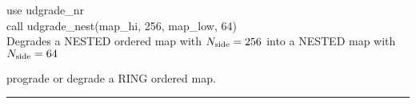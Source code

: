 \begin{example}
{
use udgrade\_nr \\
call udgrade\_nest(map\_hi, 256, map\_low, 64)  \\
}
{
Degrades a NESTED ordered map with $N_{\mathrm{side}}=256$ into a NESTED map with $N_{\mathrm{side}}=64$
}
\end{example}

\begin{related}
  \begin{sulist}{} %
  \item[\htmlref{udgrade\_ring}{sub:udgrade_ring}] prograde or degrade a RING
  ordered map.
  \end{sulist}
\end{related}

\rule{\hsize}{2mm}

\newpage
